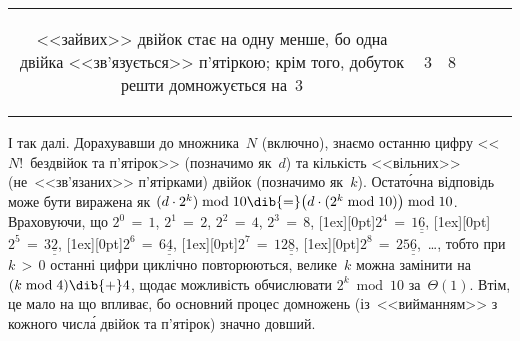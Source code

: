 {\begin{longtable}{@{}c|c|l|p{\widestColumn}|c|c@{}}
\begin{minipage}{\widestColumn}
\begin{small}
<<зайвих>> двійок стає на одну менше, бо одна двійка <<зв'язується>> п'ятіркою;
крім того, добуток решти домножується на~3
\par\end{small}\end{minipage}
&
3 & 8 
\end{longtable}

\vspace{-\baselineskip}

І так далі. 
%
Дорахувавши до %
множника~$N$ (включно), знаємо останню цифру <<$N!$~без\nolinebreak[2] двійок та п'ятірок>> (позначимо як~$d$) та кількість <<вільних>> (не~<<зв'язаних>> п'ятірками) двійок (позначимо як~$k$). Остат\'{о}чна відповідь може бути виражена як 
$(d\cdot2^k)\bmod10
\dib{{=}}
\bigl(d\cdot(2^k\bmod10)\bigr)\bmod10$. Враховуючи, що
${2^0\,{=}\,1}$,
${2^1\,{=}\,2}$,
${2^2\,{=}\,4}$,
${2^3\,{=}\,8}$,
\raisebox{0pt}[1ex][0pt]{${2^4\,{=}\,1\underline{\underline{6}}}$},
\raisebox{0pt}[1ex][0pt]{${2^5\,{=}\,3\underline{\underline{2}}}$},
\raisebox{0pt}[1ex][0pt]{${2^6\,{=}\,6\underline{\underline{4}}}$},
\raisebox{0pt}[1ex][0pt]{${2^7\,{=}\,12\underline{\underline{8}}}$},
\raisebox{0pt}[1ex][0pt]{${2^8\,{=}\,25\underline{\underline{6}}}$},~\dots,
тобто при ${k\,{>}\,0}$ останні цифри циклічно повторюються,
велике~$k$ можна замінити на\nolinebreak[2] ${(k\bmod4)}\dib{{+}}4$, 
що\nolinebreak[3] дає можливість обчислювати $2^k\bmod10$ за~$\Theta(1)$.
Втім, це мало на що впливає, бо основний процес домножень (із~<<вийманням>> з кожного %
числ\'{а} двійок та п'ятірок) значно довший.

}
